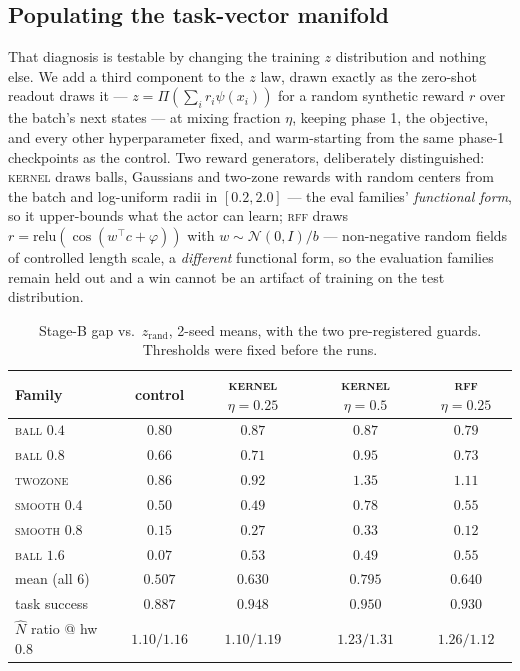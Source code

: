 \documentclass[10pt]{article}
\begin{document}
\subsection{Populating the task-vector manifold}
\label{sec:exp-rewardz}

That diagnosis is testable by changing the training $z$ distribution and nothing
else. We add a third component to the $z$ law, drawn exactly as the zero-shot
readout draws it --- $z=\Pi(\sum_i r_i\psi(x_i))$ for a random synthetic reward
$r$ over the batch's next states --- at mixing fraction $\eta$, keeping phase 1,
the objective, and every other hyperparameter fixed, and warm-starting from the
same phase-1 checkpoints as the control. Two reward generators, deliberately
distinguished:
\textsc{kernel} draws balls, Gaussians and two-zone rewards with random centers
from the batch and log-uniform radii in $[0.2,2.0]$ --- the eval families'
\emph{functional form}, so it upper-bounds what the actor can learn;
\textsc{rff} draws $r=\mathrm{relu}(\cos(w^\top c+\varphi))$ with
$w\sim\mathcal N(0,I)/b$ --- non-negative random fields of controlled length
scale, a \emph{different} functional form, so the evaluation families remain held
out and a win cannot be an artifact of training on the test distribution.

\begin{table}[h]
\centering\small
\setlength{\tabcolsep}{6pt}
\begin{tabular}{l c c c c}
\toprule
\textbf{Family} & control & \textsc{kernel} $\eta{=}0.25$ & \textsc{kernel} $\eta{=}0.5$ & \textsc{rff} $\eta{=}0.25$ \\
\midrule
\textsc{ball} $0.4$   & $0.80$ & $0.87$ & $0.87$ & $0.79$ \\
\textsc{ball} $0.8$   & $0.66$ & $0.71$ & $\mathbf{0.95}$ & $0.73$ \\
\textsc{twozone}      & $0.86$ & $0.92$ & $\mathbf{1.35}$ & $1.11$ \\
\textsc{smooth} $0.4$ & $0.50$ & $0.49$ & $\mathbf{0.78}$ & $0.55$ \\
\textsc{smooth} $0.8$ & $0.15$ & $0.27$ & $0.33$ & $0.12$ \\
\textsc{ball} $1.6$   & $\mathbf{0.07}$ & $\mathbf{0.53}$ & $\mathbf{0.49}$ & $\mathbf{0.55}$ \\
\midrule
mean (all 6) & $0.507$ & $0.630$ & $\mathbf{0.795}$ & $0.640$ \\
task success & $0.887$ & $0.948$ & $0.950$ & $0.930$ \\
$\hat N$ ratio @ hw $0.8$ & $1.10/1.16$ & $1.10/1.19$ & $1.23/1.31$ & $1.26/1.12$ \\
\bottomrule
\end{tabular}
\caption{Stage-B gap vs.\ $z_{\text{rand}}$, 2-seed means, with the two
pre-registered guards. Thresholds were fixed before the runs.}
\label{tab:rewardz}
\end{table}
\end{document}
